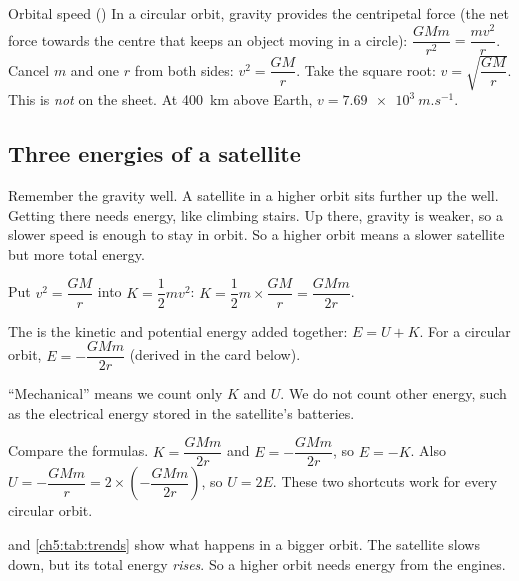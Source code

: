 \begin{refresher}{Orbital speed ()}
In a circular orbit, gravity provides the centripetal force (the net force
towards the centre that keeps an object moving in a circle):
$\dfrac{GMm}{r^2} = \dfrac{mv^2}{r}$. Cancel $m$ and one $r$ from both sides:
$v^2 = \dfrac{GM}{r}$. Take the square root: $v = \sqrt{\dfrac{GM}{r}}$. This is
\emph{not} on the sheet. At \qty{400}{km} above Earth,
$v = \qty{7.69e3}{m.s^{-1}}$.
\end{refresher}

\subsection{Three energies of a satellite}

Remember the gravity well. A satellite in a higher orbit sits further up the
well. Getting there needs energy, like climbing stairs. Up there, gravity is
weaker, so a slower speed is enough to stay in orbit. So a higher orbit means a
slower satellite but more total energy.

Put $v^2 = \dfrac{GM}{r}$ into $K = \dfrac{1}{2}mv^2$:
$K = \dfrac{1}{2}m \times \dfrac{GM}{r} = \dfrac{GMm}{2r}$.

The  is the kinetic and potential energy added
together: $E = U + K$. For a circular orbit, $E = -\dfrac{GMm}{2r}$ (derived in
the card below).

``Mechanical'' means we count only $K$ and $U$. We do not count other energy,
such as the electrical energy stored in the satellite's batteries.

Compare the formulas. $K = \dfrac{GMm}{2r}$ and $E = -\dfrac{GMm}{2r}$, so
$E = -K$. Also $U = -\dfrac{GMm}{r} = 2 \times \left(-\dfrac{GMm}{2r}\right)$,
so $U = 2E$. These two shortcuts work for every circular orbit.

 and \cref{ch5:tab:trends} show what happens in a bigger orbit.
The satellite slows down, but its total energy \emph{rises}. So a higher orbit
needs energy from the engines.

